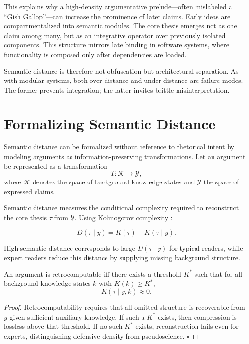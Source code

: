 This explains why a high-density argumentative prelude—often mislabeled a ``Gish Gallop''—can increase the prominence of later claims. Early ideas are compartmentalized into semantic modules. The core thesis emerges not as one claim among many, but as an integrative operator over previously isolated components. This structure mirrors late binding in software systems, where functionality is composed only after dependencies are loaded.

Semantic distance is therefore not obfuscation but architectural separation. As with modular systems, both over-distance and under-distance are failure modes. The former prevents integration; the latter invites brittle misinterpretation.

\section{Formalizing Semantic Distance}

Semantic distance can be formalized without reference to rhetorical intent by modeling arguments as information-preserving transformations. Let an argument be represented as a transformation
\[
T : \mathcal{K} \rightarrow \mathcal{Y},
\]
where $\mathcal{K}$ denotes the space of background knowledge states and $\mathcal{Y}$ the space of expressed claims.

Semantic distance measures the conditional complexity required to reconstruct the core thesis $\tau$ from $\mathcal{Y}$. Using Kolmogorov complexity \cite{kolmogorov1965,liVitanyi}:

\[
D(\tau \mid y) = K(\tau) - K(\tau \mid y).
\]

High semantic distance corresponds to large $D(\tau \mid y)$ for typical readers, while expert readers reduce this distance by supplying missing background structure.

\begin{lemma}
An argument is retrocomputable iff there exists a threshold $K^*$ such that for all background knowledge states $k$ with $K(k) \ge K^*$,
\[
K(\tau \mid y, k) \approx 0.
\]
\end{lemma}

\begin{proof}
Retrocomputability requires that all omitted structure is recoverable from $y$ given sufficient auxiliary knowledge. If such a $K^*$ exists, then compression is lossless above that threshold. If no such $K^*$ exists, reconstruction fails even for experts, distinguishing defensive density from pseudoscience. \hfill $\square$
\end{proof}


